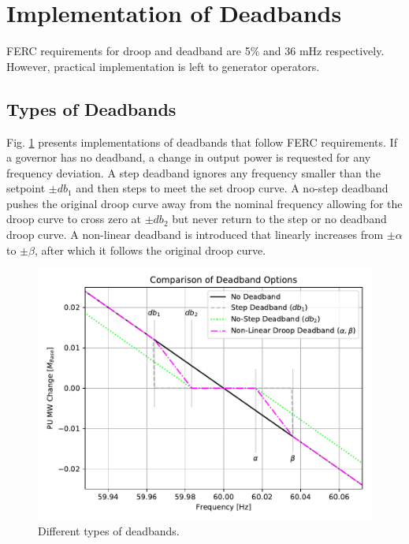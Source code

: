 \section{Implementation of Deadbands}
FERC requirements for droop and deadband are 5\% and 36 mHz respectively\cite{ferc2018}.
However, practical implementation is left to generator operators.

\subsection{Types of Deadbands}
Fig. \ref{fig: deadbandType} presents implementations of deadbands that follow FERC requirements.
If a governor has no deadband, a change in output power is requested for any frequency deviation.
A step deadband ignores any frequency smaller than the setpoint $\pm db_1$ and then steps to meet the set droop curve.
A no-step deadband pushes the original droop curve away from the nominal frequency allowing for the droop curve to cross zero at $\pm db_2$ but never return to the step or no deadband droop curve.
A non-linear deadband is introduced that linearly increases from $\pm \alpha$ to $\pm \beta$, after which it follows the original droop curve.

\begin{figure}[!ht]
	\centering
	\includegraphics[width=\linewidth]{figures/dbAction3}
	\caption{Different types of deadbands.}
	\label{fig: deadbandType}
\end{figure}